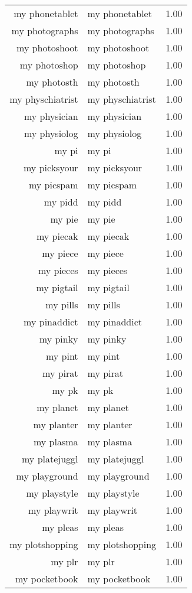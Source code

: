 \begin{table}[ht]
\begin{tabular}{rlr}
  my phonetablet & my phonetablet & 1.00 \\ 
  my photographs & my photographs & 1.00 \\ 
  my photoshoot & my photoshoot & 1.00 \\ 
  my photoshop & my photoshop & 1.00 \\ 
  my photosth & my photosth & 1.00 \\ 
  my physchiatrist & my physchiatrist & 1.00 \\ 
  my physician & my physician & 1.00 \\ 
  my physiolog & my physiolog & 1.00 \\ 
  my pi & my pi & 1.00 \\ 
  my picksyour & my picksyour & 1.00 \\ 
  my picspam & my picspam & 1.00 \\ 
  my pidd & my pidd & 1.00 \\ 
  my pie & my pie & 1.00 \\ 
  my piecak & my piecak & 1.00 \\ 
  my piece & my piece & 1.00 \\ 
  my pieces & my pieces & 1.00 \\ 
  my pigtail & my pigtail & 1.00 \\ 
  my pills & my pills & 1.00 \\ 
  my pinaddict & my pinaddict & 1.00 \\ 
  my pinky & my pinky & 1.00 \\ 
  my pint & my pint & 1.00 \\ 
  my pirat & my pirat & 1.00 \\ 
  my pk & my pk & 1.00 \\ 
  my planet & my planet & 1.00 \\ 
  my planter & my planter & 1.00 \\ 
  my plasma & my plasma & 1.00 \\ 
  my platejuggl & my platejuggl & 1.00 \\ 
  my playground & my playground & 1.00 \\ 
  my playstyle & my playstyle & 1.00 \\ 
  my playwrit & my playwrit & 1.00 \\ 
  my pleas & my pleas & 1.00 \\ 
  my plotshopping & my plotshopping & 1.00 \\ 
  my plr & my plr & 1.00 \\ 
  my pocketbook & my pocketbook & 1.00 \\ 

\end{tabular}
\end{table}
